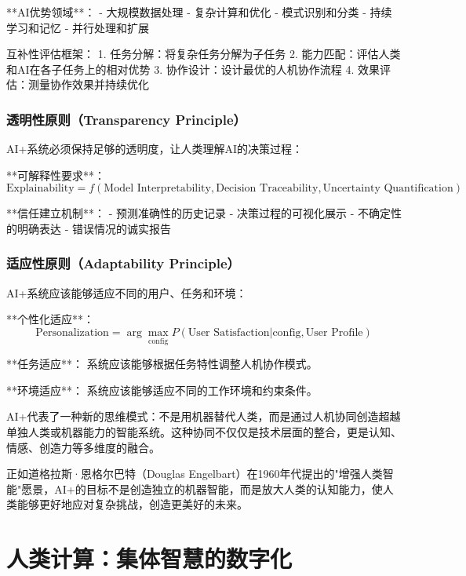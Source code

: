 **AI优势领域**：
- 大规模数据处理
- 复杂计算和优化
- 模式识别和分类
- 持续学习和记忆
- 并行处理和扩展

\begin{center}
互补性评估框架：
1. 任务分解：将复杂任务分解为子任务
2. 能力匹配：评估人类和AI在各子任务上的相对优势
3. 协作设计：设计最优的人机协作流程
4. 效果评估：测量协作效果并持续优化
\end{center}

\subsubsection{透明性原则（Transparency Principle）}

AI+系统必须保持足够的透明度，让人类理解AI的决策过程：

**可解释性要求**：
\begin{equation}
\text{Explainability} = f(\text{Model Interpretability}, \text{Decision Traceability}, \text{Uncertainty Quantification})
\end{equation}

**信任建立机制**：
- 预测准确性的历史记录
- 决策过程的可视化展示
- 不确定性的明确表达
- 错误情况的诚实报告

\subsubsection{适应性原则（Adaptability Principle）}

AI+系统应该能够适应不同的用户、任务和环境：

**个性化适应**：
\begin{equation}
\text{Personalization} = \arg\max_{\text{config}} P(\text{User Satisfaction}|\text{config}, \text{User Profile})
\end{equation}

**任务适应**：
系统应该能够根据任务特性调整人机协作模式。

**环境适应**：
系统应该能够适应不同的工作环境和约束条件。

AI+代表了一种新的思维模式：不是用机器替代人类，而是通过人机协同创造超越单独人类或机器能力的智能系统。这种协同不仅仅是技术层面的整合，更是认知、情感、创造力等多维度的融合。

正如道格拉斯·恩格尔巴特（Douglas Engelbart）在1960年代提出的"增强人类智能"愿景，AI+的目标不是创造独立的机器智能，而是放大人类的认知能力，使人类能够更好地应对复杂挑战，创造更美好的未来。

\section{人类计算：集体智慧的数字化}

